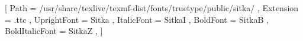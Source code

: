 

\usepackage{fontspec}
\setmainfont[Mapping=tex-text]{sitka}[
	Path = /usr/share/texlive/texmf-dist/fonts/truetype/public/sitka/ ,
	Extension       =  .ttc ,
	UprightFont     =  Sitka   ,
	ItalicFont      =  SitkaI ,
	BoldFont        =  SitkaB    ,
	BoldItalicFont  =  SitkaZ ,
]